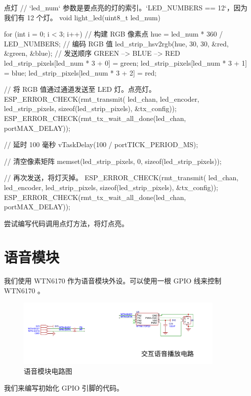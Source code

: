 \documentclass[lang=cn,newtx,10pt,scheme=chinese]{elegantbook}
\begin{document}
\begin{mycode}{点灯}
// `led_num` 参数是要点亮的灯的索引。`LED_NUMBERS == 12`，因为我们有 12 个灯。
void light_led(uint8_t led_num)
{
    for (int i = 0; i < 3; i++)
    {
        // 构建 RGB 像素点
        hue = led_num * 360 / LED_NUMBERS;
        // 编码 RGB 值
        led_strip_hsv2rgb(hue, 30, 30, &red, &green, &blue);
        // 发送顺序 GREEN --> BLUE --> RED
        led_strip_pixels[led_num * 3 + 0] = green;
        led_strip_pixels[led_num * 3 + 1] = blue;
        led_strip_pixels[led_num * 3 + 2] = red;
    }

    // 将 RGB 值通过通道发送至 LED 灯。点亮灯。
    ESP_ERROR_CHECK(rmt_transmit(
        led_chan,
        led_encoder,
        led_strip_pixels,
        sizeof(led_strip_pixels),
        &tx_config));
    ESP_ERROR_CHECK(rmt_tx_wait_all_done(led_chan, portMAX_DELAY));

    // 延时 100 毫秒
    vTaskDelay(100 / portTICK_PERIOD_MS);

    // 清空像素矩阵
    memset(led_strip_pixels, 0, sizeof(led_strip_pixels));

    // 再次发送，将灯灭掉。
    ESP_ERROR_CHECK(rmt_transmit(
        led_chan,
        led_encoder,
        led_strip_pixels,
        sizeof(led_strip_pixels),
        &tx_config));
    ESP_ERROR_CHECK(rmt_tx_wait_all_done(led_chan, portMAX_DELAY));
}
\end{mycode}

尝试编写代码调用点灯方法，将灯点亮。

\chapter{语音模块}

我们使用 WTN6170 作为语音模块外设。可以使用一根 GPIO 线来控制 WTN6170 。

\begin{figure}[!htb]
\centering
\includegraphics[width=0.9\textwidth]{WTN6170.png}
\caption{语音模块电路图}
\end{figure}

我们来编写初始化 GPIO 引脚的代码。
\end{document}
